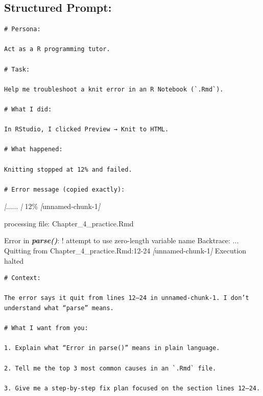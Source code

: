 \documentclass[
  12pt,
]{scrreprt}
\newenvironment{Shaded}{\begin{snugshade}}{\end{snugshade}}
\newcommand{\CommentTok}[1]{\textcolor[rgb]{0.56,0.35,0.01}{\textit{#1}}}
\newcommand{\InformationTok}[1]{\textcolor[rgb]{0.56,0.35,0.01}{\textbf{\textit{#1}}}}
\newcommand{\NormalTok}[1]{#1}
\newcommand{\OtherTok}[1]{\textcolor[rgb]{0.56,0.35,0.01}{#1}}
\newcommand{\PreprocessorTok}[1]{\textcolor[rgb]{0.56,0.35,0.01}{\textit{#1}}}
\begin{document}
\subsection{Structured Prompt:}\label{structured-prompt}

\begin{verbatim}
# Persona: 

Act as a R programming tutor.

# Task: 

Help me troubleshoot a knit error in an R Notebook (`.Rmd`). 

# What I did: 

In RStudio, I clicked Preview → Knit to HTML.

# What happened: 

Knitting stopped at 12% and failed.

# Error message (copied exactly):
\end{verbatim}

\begin{Shaded}
\begin{Highlighting}[]
\PreprocessorTok{|}\NormalTok{......                                              }\PreprocessorTok{|}\NormalTok{  12\% }\CommentTok{[}\OtherTok{unnamed{-}chunk{-}1}\CommentTok{]}

\NormalTok{processing file: Chapter\_4\_practice.Rmd}

\NormalTok{Error in }\InformationTok{\textasciigrave{}parse()\textasciigrave{}}\NormalTok{:}
\NormalTok{! attempt to use zero{-}length variable name}
\NormalTok{Backtrace:}
\NormalTok{...}
\NormalTok{Quitting from Chapter\_4\_practice.Rmd:12{-}24 }\CommentTok{[}\OtherTok{unnamed{-}chunk{-}1}\CommentTok{]}
\NormalTok{Execution halted}
\end{Highlighting}
\end{Shaded}

\begin{verbatim}
# Context: 

The error says it quit from lines 12–24 in unnamed-chunk-1. I don’t understand what “parse” means.

# What I want from you:

1. Explain what “Error in parse()” means in plain language.

2. Tell me the top 3 most common causes in an `.Rmd` file.

3. Give me a step-by-step fix plan focused on the section lines 12–24.
\end{verbatim}
\end{document}
